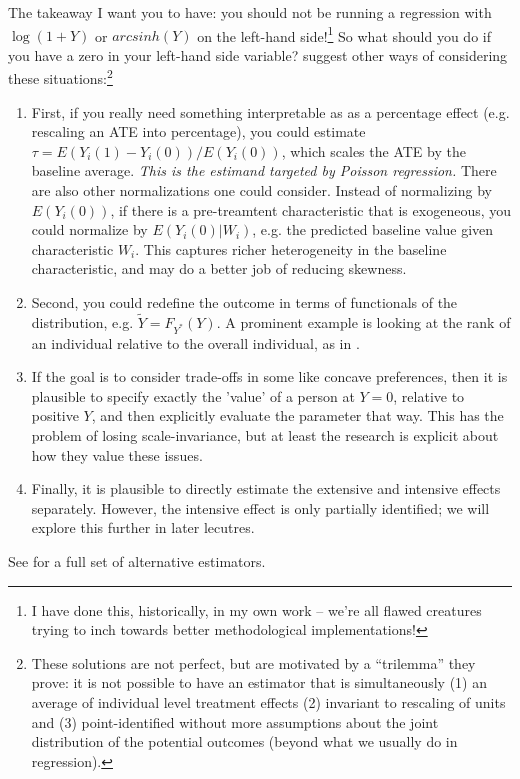 \documentclass{tufte-handout}
\theoremstyle{break}
\begin{document}
The takeaway I want you to have: you should not be running a regression with $\log(1+Y)$ or $arcsinh(Y)$ on the left-hand side!\footnote{I have done this, historically, in my own work -- we're all flawed creatures trying to inch towards better methodological implementations!} So what should you do if you have a zero in your left-hand side variable? \citet{chen2023logs} suggest other ways of considering these situations:\footnote{These solutions are not perfect, but are motivated by a ``trilemma'' they prove: it is not possible to have an estimator that is simultaneously (1) an average of individual level treatment effects (2) invariant to rescaling of units and (3) point-identified without more assumptions about the joint distribution of the potential outcomes (beyond what we usually do in regression).}
\begin{enumerate}
  \item First, if you really need something interpretable as as a percentage effect (e.g. rescaling an ATE into percentage), you could estimate $\tau = E(Y_{i}(1) - Y_{i}(0)) / E(Y_{i}(0))$, which scales the ATE by the baseline average. \emph{This is the estimand targeted by Poisson regression.} There are also other normalizations one could consider. Instead of normalizing by $E(Y_{i}(0))$, if there is a pre-treamtent characteristic that is exogeneous, you could normalize by $E(Y_{i}(0) | W_{i})$, e.g. the predicted baseline value given characteristic $W_{i}$. This captures richer heterogeneity in the baseline characteristic, and may do a better job of reducing skewness. 
  \item Second, you could redefine the outcome in terms of functionals of the distribution, e.g. $\tilde{Y} = F_{Y^{*}}(Y)$. A prominent example is looking at the rank of an individual relative to the overall individual, as in \citet{chetty2014land}. 
  \item If the goal is to consider trade-offs in some like concave preferences, then it is plausible to specify exactly the 'value' of a person at $Y = 0$, relative to positive $Y$, and then explicitly evaluate the parameter that way. This has the problem of losing scale-invariance, but at least the research is explicit about how they value these issues.
  \item Finally, it is plausible to directly estimate the extensive and intensive effects separately. However, the intensive effect is only partially identified; we will explore this further in later lecutres. 
\end{enumerate}
See  for a full set of alternative estimators. 
\end{document}

